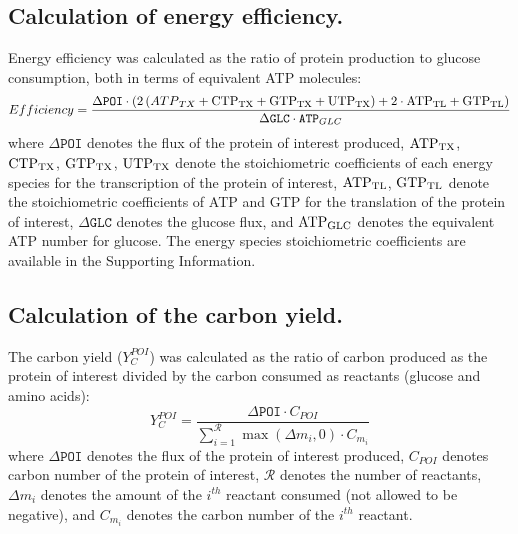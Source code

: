 \documentclass[journal=asbcd6,manuscript=article]{achemso}
\begin{document}
\subsection*{Calculation of energy efficiency.}
Energy efficiency was calculated as the ratio of protein production to glucose consumption, both in terms of equivalent ATP molecules:
\begin{equation}\label{eqn:energy-efficiency-definition}
	Efficiency=\frac{\Delta\texttt{POI}\cdot \left(2\left({ATP}_{TX}+\rm {CTP}_{TX}+\rm {GTP}_{TX}+\rm {UTP}_{TX}\right)+\rm2\cdot\rm {ATP}_{TL}+\rm {GTP}_{TL}\right)}{\Delta\texttt{GLC}\cdot\texttt{ATP}_{GLC}}
\end{equation}
where $\Delta\texttt{POI}$ denotes the flux of the protein of interest produced, $\rm {ATP}_{TX}$, $\rm {CTP}_{TX}$, $\rm {GTP}_{TX}$, $\rm {UTP}_{TX}$ denote the stoichiometric coefficients of each energy species for the transcription of the protein of interest, $\rm {ATP}_{TL}$, $\rm {GTP}_{TL}$ denote the stoichiometric coefficients of ATP and GTP for the translation of the protein of interest, $\Delta\texttt{GLC}$ denotes the glucose flux, and $\rm {ATP}_{GLC}$ denotes the equivalent ATP number for glucose.
The energy species stoichiometric coefficients are available in the Supporting Information.

\subsection*{Calculation of the carbon yield.}
The carbon yield ($Y_{C}^{POI}$) was calculated as the ratio of carbon produced as the protein of interest divided by the carbon consumed as reactants (glucose and amino acids):
\begin{equation}\label{eqn:yield-definition}
	Y_{C}^{POI}=\frac{\Delta\texttt{POI}\cdot C_{POI}}{\displaystyle\sum_{i=1}^{\mathcal{R}}\max(\Delta m_{i},0)\cdot C_{m_i}}
\end{equation}
where $\Delta\texttt{POI}$ denotes the flux of the protein of interest produced, $C_{POI}$ denotes carbon number of the protein of interest, $\mathcal{R}$ denotes the number of reactants,
$\Delta m_{i}$ denotes the amount of the $i^{th}$ reactant consumed (not allowed to be negative), and $C_{m_i}$ denotes the carbon number of the $i^{th}$ reactant.
\end{document}

